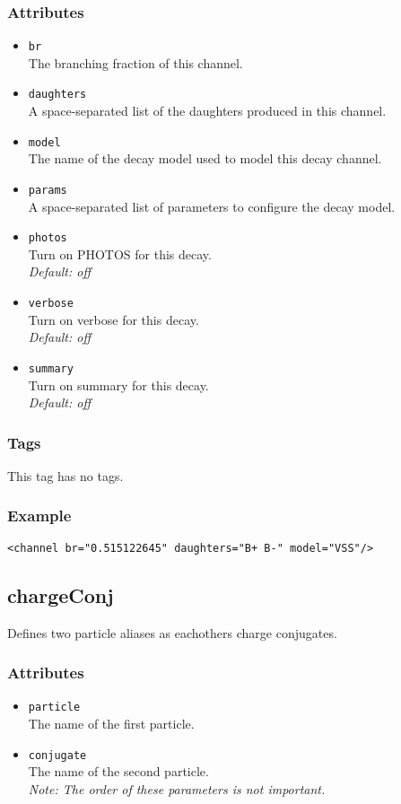 \subsubsection*{Attributes}
\begin{itemize}
\item{\tt br}\\
      The branching fraction of this channel.
\item{\tt daughters}\\
      A space-separated list of the daughters produced in this channel.
\item{\tt model}\\
      The name of the decay model used to model this decay channel.
\item{\tt params}\\
      A space-separated list of parameters to configure the decay model.
\item{\tt photos}\\
      Turn on PHOTOS for this decay.\\
      \emph{Default: off}
\item{\tt verbose}\\
      Turn on verbose for this decay.\\
      \emph{Default: off}
\item{\tt summary}\\
      Turn on summary for this decay.\\
      \emph{Default: off}
\end{itemize}
\subsubsection*{Tags}
This tag has no tags.
\subsubsection*{Example}
{\footnotesize
\begin{verbatim}
<channel br="0.515122645" daughters="B+ B-" model="VSS"/>
\end{verbatim}
}

\subsection{chargeConj}
Defines two particle aliases as eachothers charge conjugates.
\subsubsection*{Attributes}
\begin{itemize}
\item{\tt particle}\\
      The name of the first particle.
\item{\tt conjugate}\\
      The name of the second particle.\\
      \emph{Note: The order of these parameters is not important.}
\end{itemize}
